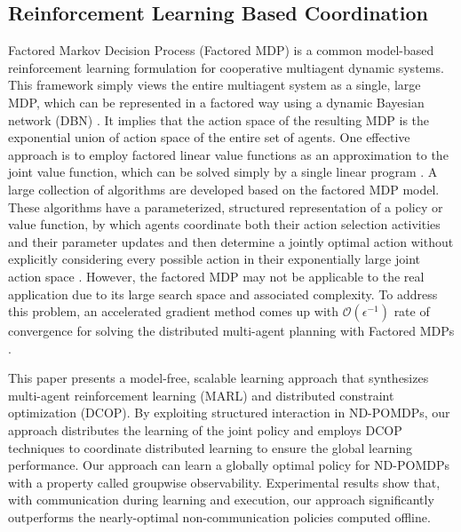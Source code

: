 \documentclass[conference]{IEEEtran}
\begin{document}
\subsection{Reinforcement Learning Based Coordination}
Factored Markov Decision Process (Factored MDP) is a common model-based
reinforcement learning formulation for cooperative multiagent dynamic systems.
This framework simply views the entire multiagent system as a single, large
MDP, which can be represented in a factored way using a dynamic Bayesian
network (DBN) \cite{guestrin2001multiagent}. 
It implies that the action space of the resulting MDP is the exponential union
of action space of the entire set of agents. 
One effective approach is to employ factored linear value functions as an
approximation to the joint value function, which can be solved simply by a
single linear program \cite{guestrin2001multiagent}. 
A large collection of algorithms are developed based on the factored MDP model. 
These algorithms have a parameterized, structured representation of a policy
or value function, by which agents coordinate both their action selection
activities and their parameter updates and then determine a jointly optimal
action without explicitly considering every possible action in their
exponentially large joint action space \cite{guestrin2002coordinated}. 
However, the factored MDP may not be applicable to the real application due to
its large search space and associated complexity.
To address this problem, an accelerated gradient method comes up with
$\mathcal{O}(\epsilon^{-1})$ rate of convergence for solving the distributed
multi-agent planning with Factored MDPs \cite{suegeo2011accgrad}.




\cite{zhang2011coordinated} This paper presents a
model-free, scalable learning approach that synthesizes
multi-agent reinforcement learning (MARL) and distributed
constraint optimization (DCOP). By exploiting
structured interaction in ND-POMDPs, our approach
distributes the learning of the joint policy and employs
DCOP techniques to coordinate distributed learning to
ensure the global learning performance. Our approach
can learn a globally optimal policy for ND-POMDPs
with a property called groupwise observability. Experimental
results show that, with communication during
learning and execution, our approach significantly outperforms
the nearly-optimal non-communication policies
computed offline.
\end{document}

